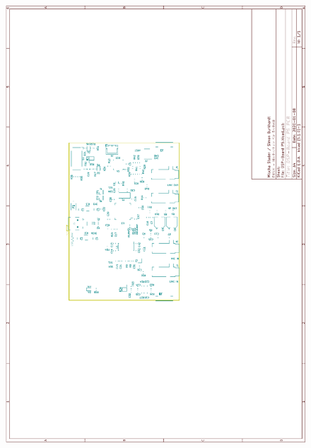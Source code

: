 \begin{appendix}
\begin{figure}[h]
	\centering
	\includegraphics[width=0.95\linewidth]{appendix/DSP-Board-PCB-V1-1(3).pdf}
\end{figure}


\end{appendix}
